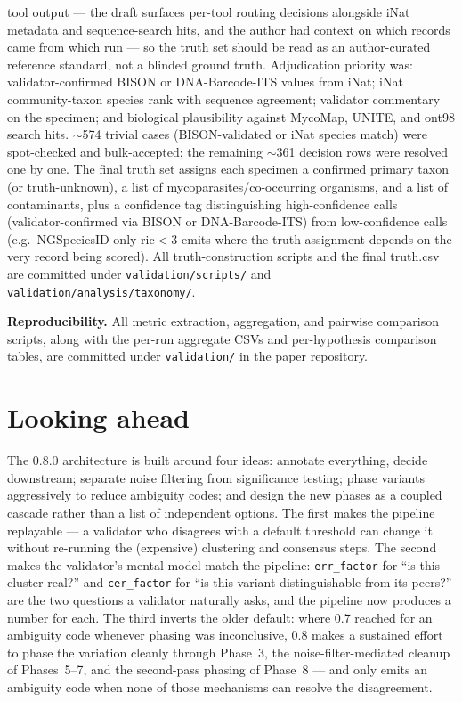 \documentclass[11pt]{article}
\begin{document}
tool output --- the draft surfaces per-tool routing decisions
alongside iNat metadata and sequence-search hits, and the author had
context on which records came from which run --- so the truth set
should be read as an author-curated reference standard, not a
blinded ground truth. Adjudication priority was: validator-confirmed
BISON or DNA-Barcode-ITS values from iNat; iNat community-taxon
species rank with sequence agreement; validator commentary on the
specimen; and biological plausibility against MycoMap, UNITE, and
ont98 search hits. $\sim$574 trivial cases (BISON-validated or iNat
species match) were spot-checked and bulk-accepted; the remaining
$\sim$361 decision rows were resolved one by one.
The final truth set assigns each specimen a confirmed primary taxon (or
truth-unknown), a list of mycoparasites/co-occurring organisms, and a
list of contaminants, plus a confidence tag distinguishing
high-confidence calls (validator-confirmed via BISON or DNA-Barcode-ITS)
from low-confidence calls (e.g.\ NGSpeciesID-only ric$<$3 emits where
the truth assignment depends on the very record being scored). All
truth-construction scripts and the final truth.csv are committed under
\texttt{validation/scripts/} and
\texttt{validation/analysis/taxonomy/}.

\textbf{Reproducibility.} All metric extraction, aggregation, and pairwise
comparison scripts, along with the per-run aggregate CSVs and per-hypothesis
comparison tables, are committed under \texttt{validation/} in the paper
repository.

\section{Looking ahead}
\label{sec:looking-ahead}

The 0.8.0 architecture is built around four ideas: annotate everything,
decide downstream; separate noise filtering from significance testing;
phase variants aggressively to reduce ambiguity codes; and design the
new phases as a coupled cascade rather than a list of independent
options. The first makes the pipeline replayable --- a validator who
disagrees with a default threshold can change it without re-running
the (expensive) clustering and consensus steps. The second makes the
validator's mental model match the pipeline: \texttt{err\_factor} for
``is this cluster real?'' and \texttt{cer\_factor} for ``is this
variant distinguishable from its peers?'' are the two questions a
validator naturally asks, and the pipeline now produces a number for
each. The third inverts the older default: where 0.7 reached for an
ambiguity code whenever phasing was inconclusive, 0.8 makes a
sustained effort to phase the variation cleanly through Phase~3, the
noise-filter-mediated cleanup of Phases~5--7, and the second-pass
phasing of Phase~8 --- and only emits an ambiguity code when none of
those mechanisms can resolve the disagreement.
\end{document}
